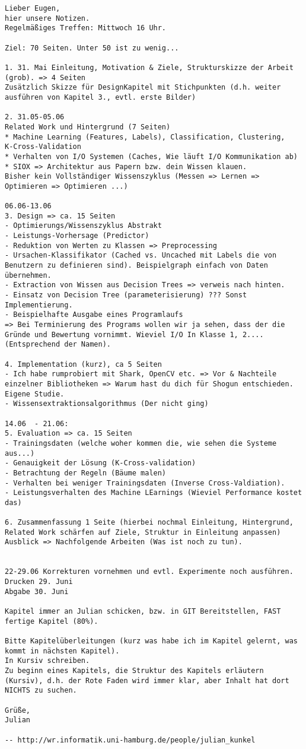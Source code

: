 \begin{verbatim}
Lieber Eugen,
hier unsere Notizen.
Regelmäßiges Treffen: Mittwoch 16 Uhr.

Ziel: 70 Seiten. Unter 50 ist zu wenig...

1. 31. Mai Einleitung, Motivation & Ziele, Strukturskizze der Arbeit
(grob). => 4 Seiten
Zusätzlich Skizze für DesignKapitel mit Stichpunkten (d.h. weiter
ausführen von Kapitel 3., evtl. erste Bilder)

2. 31.05-05.06
Related Work und Hintergrund (7 Seiten)
* Machine Learning (Features, Labels), Classification, Clustering,
K-Cross-Validation
* Verhalten von I/O Systemen (Caches, Wie läuft I/O Kommunikation ab)
* SIOX => Architektur aus Papern bzw. dein Wissen klauen.
Bisher kein Vollständiger Wissenszyklus (Messen => Lernen =>
Optimieren => Optimieren ...)

06.06-13.06
3. Design => ca. 15 Seiten
- Optimierungs/Wissenszyklus Abstrakt
- Leistungs-Vorhersage (Predictor)
- Reduktion von Werten zu Klassen => Preprocessing
- Ursachen-Klassifikator (Cached vs. Uncached mit Labels die von
Benutzern zu definieren sind). Beispielgraph einfach von Daten
übernehmen.
- Extraction von Wissen aus Decision Trees => verweis nach hinten.
- Einsatz von Decision Tree (parameterisierung) ??? Sonst Implementierung.
- Beispielhafte Ausgabe eines Programlaufs
=> Bei Terminierung des Programs wollen wir ja sehen, dass der die
Gründe und Bewertung vornimmt. Wieviel I/O In Klasse 1, 2....
(Entsprechend der Namen).

4. Implementation (kurz), ca 5 Seiten
- Ich habe rumprobiert mit Shark, OpenCV etc. => Vor & Nachteile
einzelner Bibliotheken => Warum hast du dich für Shogun entschieden.
Eigene Studie.
- Wissensextraktionsalgorithmus (Der nicht ging)

14.06  - 21.06:
5. Evaluation => ca. 15 Seiten
- Trainingsdaten (welche woher kommen die, wie sehen die Systeme aus...)
- Genauigkeit der Lösung (K-Cross-validation)
- Betrachtung der Regeln (Bäume malen)
- Verhalten bei weniger Trainingsdaten (Inverse Cross-Valdiation).
- Leistungsverhalten des Machine LEarnings (Wieviel Performance kostet das)

6. Zusammenfassung 1 Seite (hierbei nochmal Einleitung, Hintergrund,
Related Work schärfen auf Ziele, Struktur in Einleitung anpassen)
Ausblick => Nachfolgende Arbeiten (Was ist noch zu tun).


22-29.06 Korrekturen vornehmen und evtl. Experimente noch ausführen.
Drucken 29. Juni
Abgabe 30. Juni

Kapitel immer an Julian schicken, bzw. in GIT Bereitstellen, FAST
fertige Kapitel (80%).

Bitte Kapitelüberleitungen (kurz was habe ich im Kapitel gelernt, was
kommt in nächsten Kapitel).
In Kursiv schreiben.
Zu beginn eines Kapitels, die Struktur des Kapitels erläutern
(Kursiv), d.h. der Rote Faden wird immer klar, aber Inhalt hat dort
NICHTS zu suchen.

Grüße,
Julian

-- http://wr.informatik.uni-hamburg.de/people/julian_kunkel 
\end{verbatim}
